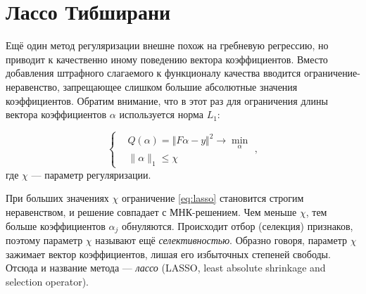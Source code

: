 \documentclass[11pt,a4paper]{article}
\begin{document}
    \hypertarget{ux43bux430ux441ux441ux43e-ux442ux438ux431ux448ux438ux440ux430ux43dux438}{%
\section{Лассо
Тибширани}\label{ux43bux430ux441ux441ux43e-ux442ux438ux431ux448ux438ux440ux430ux43dux438}}

Ещё один метод регуляризации внешне похож на гребневую регрессию, но
приводит к качественно иному поведению вектора коэффициентов. Вместо
добавления штрафного слагаемого к функционалу качества вводится
ограничение-неравенство, запрещающее слишком большие абсолютные значения
коэффициентов. Обратим внимание, что в этот раз для ограничения длины
вектора коэффициентов \(\alpha\) используется норма \(L_1\):

\[
\left\{
\begin{aligned}
    & Q(\alpha) = \Vert F\alpha - y \Vert^2 \to \min_\alpha \\
    & \|\alpha\|_1 \le \chi
\end{aligned}
\right.,
\label{eq:lasso}\tag{5}
\] где \(\chi\) --- параметр регуляризации.

При больших значениях \(\chi\) ограничение \eqref{eq:lasso} становится
строгим неравенством, и решение совпадает с МНК-решением. Чем меньше
\(\chi\), тем больше коэффициентов \(\alpha_j\) обнуляются. Происходит
отбор (селекция) признаков, поэтому параметр \(\chi\) называют ещё
\emph{селективностью}. Образно говоря, параметр \(\chi\) зажимает вектор
коэффициентов, лишая его избыточных степеней свободы. Отсюда и название
метода --- \emph{лассо} (LASSO, least absolute shrinkage and selection
operator).
\end{document}

